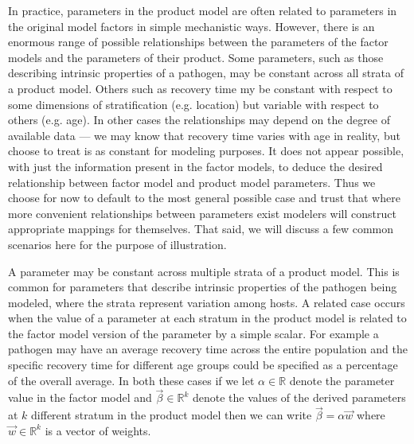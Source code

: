 \documentclass[pdflatex,sn-basic]{sn-jnl}%
\theoremstyle{definition}
\newcommand{\R}{\mathbb{R}}%
\newcommand{\betavec}{\vec{\beta}}
\begin{document}
In practice, parameters in the product model are often  related to parameters in the original model factors in simple mechanistic ways. 
However, there is an enormous range of possible relationships between the parameters of the factor models and the parameters of their product.
Some parameters, such as those describing intrinsic properties of a pathogen, may be constant across all strata of a product model. Others such as recovery time my be constant with respect to some dimensions of stratification (e.g. location) but variable with respect to others (e.g. age). In other cases the relationships may depend on the degree of available data --- we may know that recovery time varies with age in reality, but choose to treat is as constant for modeling purposes. It does not appear possible, with just the information present in the factor models, to deduce the desired relationship between factor model and product model parameters. Thus we choose for now to default to the most general possible case and trust that where more convenient relationships between parameters exist modelers will construct appropriate mappings for themselves. That said, we will discuss a few common scenarios here for the purpose of illustration. 

A parameter may be constant across multiple strata of a product model. This is common for parameters that describe intrinsic properties of the pathogen being modeled, where the strata represent variation among hosts. A related case occurs when the value of a parameter at each stratum in the product model is related to the factor model version of the parameter by a simple scalar. For example a pathogen may have an average recovery time across the entire population and the specific recovery time for different age groups could be specified as a percentage of the overall average. In both these cases if we let $\alpha\in\R$ denote the parameter value in the factor model and $\betavec\in\R^k$ denote the values of the derived parameters at $k$ different stratum in the product model then we can write $\betavec = \alpha\vec{w}$ where $\vec{w}\in\R^k$ is a vector of weights.
\end{document}
